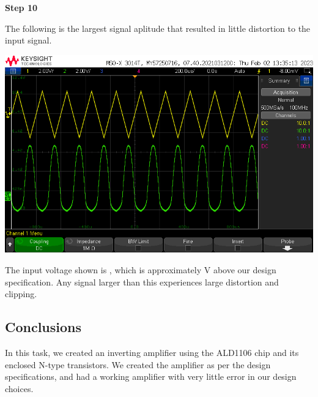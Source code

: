 \documentclass[notitlepage, 12pt]{report}  %
\begin{document}
\textbf{Step 10}

The following is the largest signal aplitude that resulted in little distortion to the input signal.

\begin{center}
    \includegraphics[scale=0.5]{tri.png}
\end{center}

The input voltage shown is %
, which is approximately %
V above our design specification. Any signal larger than this experiences large distortion and clipping.

\subsection*{Conclusions}

In this task, we created an inverting amplifier using the ALD1106 chip and its enclosed N-type transistors. We created the amplifier 
as per the design specifications, and had a working amplifier with very little error in our design choices. 


\newpage

\printbibliography[title={\Large References}] %
\end{document}
